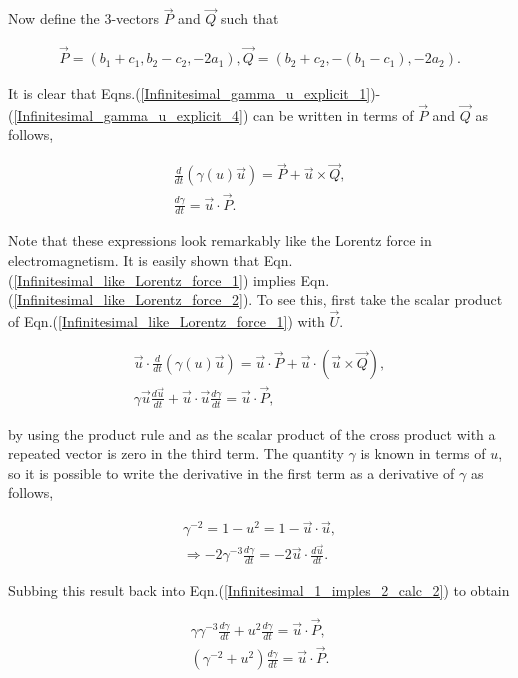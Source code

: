 Now define the $3$-vectors $\vec{P}$ and $\vec{Q}$ such that

\begin{eqnarray*}
\vec{P} = (b_1+c_1,b_2-c_2,-2a_1),
\vec{Q} = (b_2 + c_2, -(b_1 - c_1),-2a_2).
\end{eqnarray*}

It is clear that Eqns.(\ref{Infinitesimal_gamma_u_explicit_1})-(\ref{Infinitesimal_gamma_u_explicit_4}) can be written in terms of $\vec{P}$ and $\vec{Q}$ as follows,

\begin{eqnarray}\label{Infinitesimal_like_Lorentz_force_1}
\frac{d}{dt} (\gamma(u)\vec{u}) = \vec{P} + \vec{u} \times \vec{Q}, \\ \label{Infinitesimal_like_Lorentz_force_2}
\frac{d\gamma}{dt} = \vec{u} \cdot \vec{P}.
\end{eqnarray}

\noindent Note that these expressions look remarkably like the Lorentz force in electromagnetism. It is easily shown that Eqn.(\ref{Infinitesimal_like_Lorentz_force_1}) implies Eqn.(\ref{Infinitesimal_like_Lorentz_force_2}). To see this, first take the scalar product of Eqn.(\ref{Infinitesimal_like_Lorentz_force_1}) with $\vec{U}$.

\begin{eqnarray}\label{Infinitesimal_1_imples_2_calc_1}
\vec{u} \cdot \frac{d}{dt} (\gamma(u)\vec{u}) = \vec{u} \cdot \vec{P} + \vec{u} \cdot (\vec{u} \times \vec{Q}), \\ \label{Infinitesimal_1_imples_2_calc_2}
\gamma \vec{u} \frac{d\vec{u}}{dt} + \vec{u} \cdot \vec{u} \frac{d\gamma}{dt} = \vec{u} \cdot \vec{P},
\end{eqnarray}

\noindent by using the product rule and as the scalar product of the cross product with a repeated vector is zero in the third term. The quantity $\gamma$ is known in terms of $u$, so it is possible to write the derivative in the first term as a derivative of $\gamma$ as follows,

\begin{eqnarray*} 
\gamma^{-2} = 1 - u^{2} = 1- \vec{u} \cdot \vec{u}, \\
\Rightarrow -2 \gamma^{-3} \frac{d\gamma}{dt} = - 2 \vec{u} \cdot \frac{d \vec{u}}{dt}.
\end{eqnarray*}

\noindent Subbing this result back into Eqn.(\ref{Infinitesimal_1_imples_2_calc_2}) to obtain

\begin{eqnarray*} 
\gamma \gamma^{-3} \frac{d\gamma}{dt} + u^2 \frac{d\gamma}{dt} = \vec{u} \cdot \vec{P}, \\
(\gamma^{-2} + u^2) \frac{d\gamma}{dt} = \vec{u} \cdot \vec{P}.
\end{eqnarray*} 

